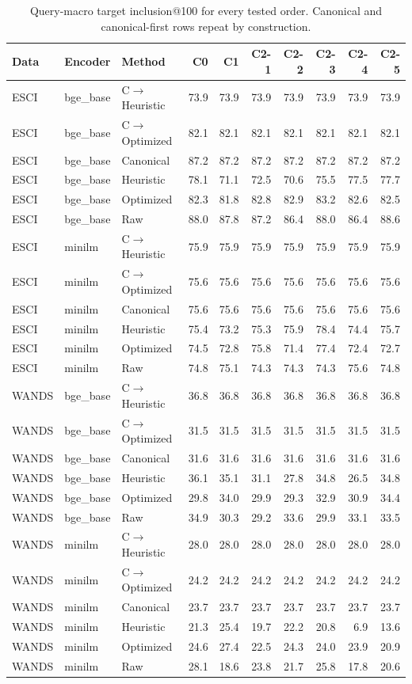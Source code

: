 \begin{table}[t]\caption{Query-macro target inclusion@100 for every tested order. Canonical and canonical-first rows repeat by construction.}\label{tab:optorders}\centering\scriptsize
\begin{tabular}{lllrrrrrrr}\toprule Data&Encoder&Method&C0&C1&C2-1&C2-2&C2-3&C2-4&C2-5\\\midrule
ESCI & bge\_base & C$\to$Heuristic & 73.9 & 73.9 & 73.9 & 73.9 & 73.9 & 73.9 & 73.9\\
ESCI & bge\_base & C$\to$Optimized & 82.1 & 82.1 & 82.1 & 82.1 & 82.1 & 82.1 & 82.1\\
ESCI & bge\_base & Canonical & 87.2 & 87.2 & 87.2 & 87.2 & 87.2 & 87.2 & 87.2\\
ESCI & bge\_base & Heuristic & 78.1 & 71.1 & 72.5 & 70.6 & 75.5 & 77.5 & 77.7\\
ESCI & bge\_base & Optimized & 82.3 & 81.8 & 82.8 & 82.9 & 83.2 & 82.6 & 82.5\\
ESCI & bge\_base & Raw & 88.0 & 87.8 & 87.2 & 86.4 & 88.0 & 86.4 & 88.6\\
ESCI & minilm & C$\to$Heuristic & 75.9 & 75.9 & 75.9 & 75.9 & 75.9 & 75.9 & 75.9\\
ESCI & minilm & C$\to$Optimized & 75.6 & 75.6 & 75.6 & 75.6 & 75.6 & 75.6 & 75.6\\
ESCI & minilm & Canonical & 75.6 & 75.6 & 75.6 & 75.6 & 75.6 & 75.6 & 75.6\\
ESCI & minilm & Heuristic & 75.4 & 73.2 & 75.3 & 75.9 & 78.4 & 74.4 & 75.7\\
ESCI & minilm & Optimized & 74.5 & 72.8 & 75.8 & 71.4 & 77.4 & 72.4 & 72.7\\
ESCI & minilm & Raw & 74.8 & 75.1 & 74.3 & 74.3 & 74.3 & 75.6 & 74.8\\
WANDS & bge\_base & C$\to$Heuristic & 36.8 & 36.8 & 36.8 & 36.8 & 36.8 & 36.8 & 36.8\\
WANDS & bge\_base & C$\to$Optimized & 31.5 & 31.5 & 31.5 & 31.5 & 31.5 & 31.5 & 31.5\\
WANDS & bge\_base & Canonical & 31.6 & 31.6 & 31.6 & 31.6 & 31.6 & 31.6 & 31.6\\
WANDS & bge\_base & Heuristic & 36.1 & 35.1 & 31.1 & 27.8 & 34.8 & 26.5 & 34.8\\
WANDS & bge\_base & Optimized & 29.8 & 34.0 & 29.9 & 29.3 & 32.9 & 30.9 & 34.4\\
WANDS & bge\_base & Raw & 34.9 & 30.3 & 29.2 & 33.6 & 29.9 & 33.1 & 33.5\\
WANDS & minilm & C$\to$Heuristic & 28.0 & 28.0 & 28.0 & 28.0 & 28.0 & 28.0 & 28.0\\
WANDS & minilm & C$\to$Optimized & 24.2 & 24.2 & 24.2 & 24.2 & 24.2 & 24.2 & 24.2\\
WANDS & minilm & Canonical & 23.7 & 23.7 & 23.7 & 23.7 & 23.7 & 23.7 & 23.7\\
WANDS & minilm & Heuristic & 21.3 & 25.4 & 19.7 & 22.2 & 20.8 & 6.9 & 13.6\\
WANDS & minilm & Optimized & 24.6 & 27.4 & 22.5 & 24.3 & 24.0 & 23.9 & 20.9\\
WANDS & minilm & Raw & 28.1 & 18.6 & 23.8 & 21.7 & 25.8 & 17.8 & 20.6\\
\bottomrule\end{tabular}\end{table}
